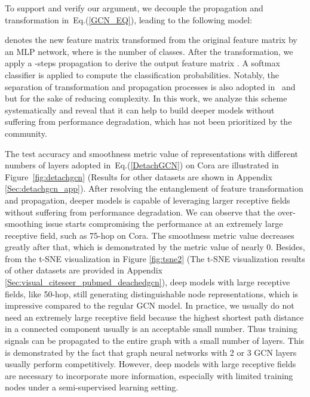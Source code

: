\documentclass[sigconf]{acmart}
\begin{document}
To support and verify our argument, we decouple the propagation and
transformation in~Eq.(\ref{GCN_EQ}), leading to the following
model:

 denotes the new feature matrix
transformed from the original feature matrix by an MLP network, where  is the number of classes. After the transformation, we apply a -steps propagation to
derive the output feature matrix . A \rm{softmax} classifier is applied to
compute the classification probabilities. Notably, the separation
of transformation and propagation processes is also adopted in~\cite{klicpera2018predict} and ~\cite{wu2019simplifying} but for
the sake of reducing complexity. In this work, we analyze
this scheme systematically and reveal that it can help to build
deeper models without suffering from performance degradation,
which has not been prioritized by the community.



The test accuracy and smoothness metric value of representations
with different numbers of layers adopted in~Eq.(\ref{DetachGCN})
on Cora are illustrated in Figure~\ref{fig:detachgcn} (Results
for other datasets are shown in Appendix
\ref{Sec:detachgcn_app}). After resolving the entanglement of
feature transformation and propagation, deeper models is capable
of leveraging larger receptive fields without suffering from
performance degradation. We can observe that the over-smoothing
issue starts compromising the performance at an extremely large
receptive field, such as 75-hop on Cora. The smoothness metric
value decreases greatly after that, which is demonstrated by the
metric value of nearly 0. Besides, from the t-SNE visualization
in Figure \ref{fig:tsne2} (The t-SNE visualization results of
other datasets are provided in Appendix
\ref{Sec:visual_citeseer_pubmed_deachedgcn}), deep models with
large receptive fields, like 50-hop, still generating
distinguishable node representations, which is impressive
compared to the regular GCN model. In practice, we usually do not
need an extremely large receptive field because the highest
shortest path distance in a connected component usually is an
acceptable small number. Thus training signals can be propagated
to the entire graph with a small number of layers. This is
demonstrated by the fact that graph neural networks with 2 or 3
GCN layers usually perform competitively. However, deep models
with large receptive fields are necessary to incorporate more
information, especially with limited training nodes under a semi-supervised learning setting.
\end{document}
